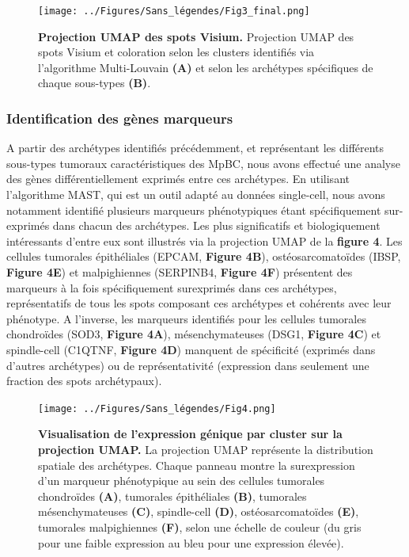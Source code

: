 \documentclass[11pt]{article}
\begin{document}
\begin{figure}[H]
    \centering
    \texttt{[image: ../Figures/Sans\_légendes/Fig3\_final.png]}
    \caption[\textbf{Figure 3 : Projection UMAP des spots Visium.}]{\footnotesize \textbf{Projection UMAP des spots Visium.}  Projection UMAP des spots Visium et coloration selon les clusters identifiés via l'algorithme Multi-Louvain \textbf{(A)} et selon les archétypes spécifiques de chaque sous-types \textbf{(B)}.}
    \label{fig:fig3}
\end{figure}

\subsubsection{Identification des gènes marqueurs}

A partir des archétypes identifiés précédemment, et représentant les différents sous-types tumoraux caractéristiques des MpBC, nous avons effectué une analyse des gènes différentiellement exprimés entre ces archétypes. En utilisant l’algorithme MAST, qui est un outil adapté au données single-cell, nous avons notamment identifié plusieurs marqueurs phénotypiques étant spécifiquement sur-exprimés dans chacun des archétypes. Les plus significatifs et biologiquement intéressants d’entre eux sont illustrés via la projection UMAP de la \textbf{figure 4}. Les cellules tumorales épithéliales (EPCAM, \textbf{Figure 4B}), ostéosarcomatoïdes (IBSP, \textbf{Figure 4E}) et malpighiennes (SERPINB4, \textbf{Figure 4F}) présentent des marqueurs à la fois spécifiquement surexprimés dans ces archétypes, représentatifs de tous les spots composant ces archétypes et cohérents avec leur phénotype. A l’inverse, les marqueurs identifiés pour les cellules tumorales chondroïdes (SOD3, \textbf{Figure 4A}), mésenchymateuses (DSG1, \textbf{Figure 4C}) et spindle-cell (C1QTNF, \textbf{Figure 4D}) manquent de spécificité (exprimés dans d’autres archétypes) ou de représentativité (expression dans seulement une fraction des spots  archétypaux).

\begin{figure}[H]
    \centering
    \texttt{[image: ../Figures/Sans\_légendes/Fig4.png]}
    \caption[\textbf{Figure 4 : Visualisation de l’expression génique par cluster sur la projection UMAP.}]{\footnotesize \textbf{Visualisation de l’expression génique par cluster sur la projection UMAP.} La projection UMAP représente la distribution spatiale des archétypes. Chaque panneau montre la surexpression d’un marqueur phénotypique au sein des cellules tumorales chondroïdes \textbf{(A)}, tumorales épithéliales \textbf{(B)}, tumorales mésenchymateuses \textbf{(C)}, spindle-cell \textbf{(D)}, ostéosarcomatoïdes \textbf{(E)}, tumorales malpighiennes \textbf{(F)}, selon une échelle de couleur (du gris pour une faible expression au bleu pour une expression élevée).}
    \label{fig:fig4}
\end{figure}
\end{document}
